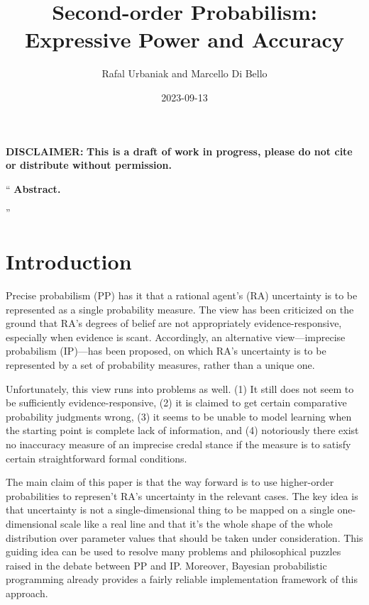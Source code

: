 \documentclass[
  10pt,
  dvipsnames,enabledeprecatedfontcommands]{scrartcl}
\title{Second-order Probabilism: Expressive Power and Accuracy}
\author{Rafal Urbaniak and Marcello Di Bello}
\date{2023-09-13}
\renewenvironment{quote}
{\list{}{\leftmargin=1em\rightmargin=1em}\item[]``}
{''\endlist}
\begin{document}
\maketitle

{
\hypersetup{linkcolor=}
\setcounter{tocdepth}{2}
\tableofcontents
}
\vspace{2cm}

\noindent \textbf{DISCLAIMER:}
\textbf{This is a draft of work in progress, please do not cite or distribute without permission.}

\thispagestyle{empty}

\newpage

\begin{quote} \textbf{Abstract.}  

\end{quote}

\section{Introduction}\label{introduction}

\label{sec:introduction}

Precise probabilism (PP) has it that a rational agent's (RA) uncertainty
is to be represented as a single probability measure. The view has been
criticized on the ground that RA's degrees of belief are not
appropriately evidence-responsive, especially when evidence is scant.
Accordingly, an alternative view---imprecise probabilism (IP)---has been
proposed, on which RA's uncertainty is to be represented by a set of
probability measures, rather than a unique one.

Unfortunately, this view runs into problems as well. (1) It still does
not seem to be sufficiently evidence-responsive, (2) it is claimed to
get certain comparative probability judgments wrong, (3) it seems to be
unable to model learning when the starting point is complete lack of
information, and (4) notoriously there exist no inaccuracy measure of an
imprecise credal stance if the measure is to satisfy certain
straightforward formal conditions.


The main claim of this paper is that the way forward is to use
higher-order probabilities to represen't RA's uncertainty in the
relevant cases. The key idea is that uncertainty is not a
single-dimensional thing to be mapped on a single one-dimensional scale
like a real line and that it's the whole shape of the whole distribution
over parameter values that should be taken under consideration. This
guiding idea can be used to resolve many problems and philosophical
puzzles raised in the debate between PP and IP. Moreover, Bayesian
probabilistic programming already provides a fairly reliable
implementation framework of this approach.
\end{document}
